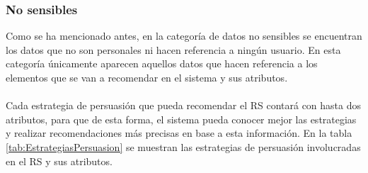\subsubsection{No sensibles}
Como se ha mencionado antes, en la categoría de datos no sensibles se encuentran los datos que no son personales ni hacen referencia a ningún usuario. En esta categoría únicamente aparecen aquellos datos que hacen referencia a los elementos que se van a recomendar en el sistema y sus atributos.
\\ \\
Cada estrategia de persuasión que pueda recomendar el RS contará con hasta dos atributos, para que de esta forma, el sistema pueda conocer mejor las estrategias y realizar recomendaciones más precisas en base a esta información. En la tabla \ref{tab:EstrategiasPersuasion} se muestran las estrategias de persuasión involucradas en el RS y sus atributos.
